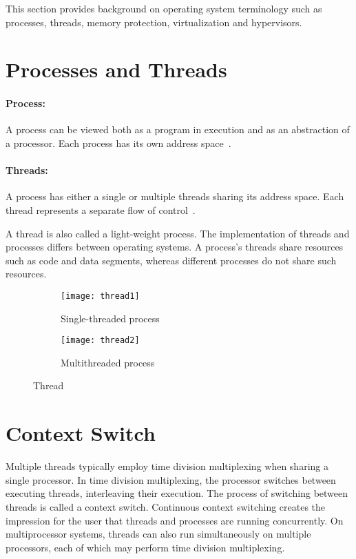 This section provides background on operating system terminology such
as processes, threads, memory protection, virtualization and hypervisors.

\section{Processes and Threads}
\paragraph{Process:} A process can be viewed both as a program in execution
and as an abstraction of a processor. Each process has its own address
space~\cite{Galvin}.

\paragraph{Threads:} A process has either a single or multiple threads
sharing its address space. Each thread represents a separate flow of
control~\cite{Galvin}.

A thread is also called a light-weight process. The implementation of
threads and processes differs between operating systems. A process's 
threads share resources such as code and data segments, whereas 
different processes do not share such resources.
\begin{figure}[!ht]
    \centering
    \begin{subfigure}[b]{0.45\textwidth}
	\texttt{[image: thread1]}
	\caption{Single-threaded process}
	\label{fig:thread1}
    \end{subfigure}
	\hfill
    \begin{subfigure}[b]{0.45\textwidth}
	\texttt{[image: thread2]}
	\caption{Multithreaded process}
	\label{fig:thread2}
    \end{subfigure}
    \caption{Thread}\label{fig:threads}
\end{figure}

\section{Context Switch}
Multiple threads typically employ time division multiplexing when sharing
a single processor.  In time division multiplexing, the processor switches
between executing threads, interleaving their execution. The process of 
switching between threads is called a context switch. Continuous context switching
creates the impression for the user that threads and processes are
running concurrently. On multiprocessor systems, threads can also run
simultaneously on multiple processors, each of which may perform time
division multiplexing.

